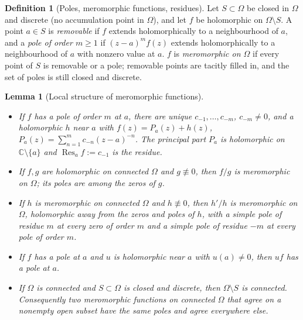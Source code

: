 \documentclass[11pt]{article}
\newtheorem{lemma}[theorem]{Lemma}
\theoremstyle{definition}
\newtheorem{definition}[theorem]{Definition}
\newcommand{\C}{\mathbb{C}}
\newcommand{\res}{\operatorname{Res}}
\begin{document}
\begin{definition}[Poles, meromorphic functions, residues]\label{def:mero}
Let $S\subset\Omega$ be closed in $\Omega$ and discrete (no accumulation point in $\Omega$), and let $f$ be holomorphic on $\Omega\setminus S$.
A point $a\in S$ is \emph{removable} if $f$ extends holomorphically to a neighbourhood of $a$, and a \emph{pole of order $m\ge1$} if $(z-a)^{m}f(z)$ extends holomorphically to a neighbourhood of $a$ with nonzero value at $a$.
$f$ is \emph{meromorphic on $\Omega$} if every point of $S$ is removable or a pole; removable points are tacitly filled in, and the set of poles is still closed and discrete.
\end{definition}

\begin{lemma}[Local structure of meromorphic functions]\label{lem:mero}
\begin{itemize}
\item[(a)] If $f$ has a pole of order $m$ at $a$, there are unique $c_{-1},\dots,c_{-m}$, $c_{-m}\ne0$, and a holomorphic $h$ near $a$ with $f(z)=P_a(z)+h(z)$, $P_a(z)=\sum_{n=1}^{m}c_{-n}(z-a)^{-n}$. The \emph{principal part} $P_a$ is holomorphic on $\C\setminus\{a\}$ and $\res_af:=c_{-1}$ is the residue.
\item[(b)] If $f,g$ are holomorphic on connected $\Omega$ and $g\not\equiv0$, then $f/g$ is meromorphic on $\Omega$; its poles are among the zeros of $g$.
\item[(c)] If $h$ is meromorphic on connected $\Omega$ and $h\not\equiv0$, then $h'/h$ is meromorphic on $\Omega$, holomorphic away from the zeros and poles of $h$, with a simple pole of residue $m$ at every zero of order $m$ and a simple pole of residue $-m$ at every pole of order $m$.
\item[(d)] If $f$ has a pole at $a$ and $u$ is holomorphic near $a$ with $u(a)\ne0$, then $uf$ has a pole at $a$.
\item[(e)] If $\Omega$ is connected and $S\subset\Omega$ is closed and discrete, then $\Omega\setminus S$ is connected. Consequently two meromorphic functions on connected $\Omega$ that agree on a nonempty open subset have the same poles and agree everywhere else.
\end{itemize}
\end{lemma}
\end{document}
